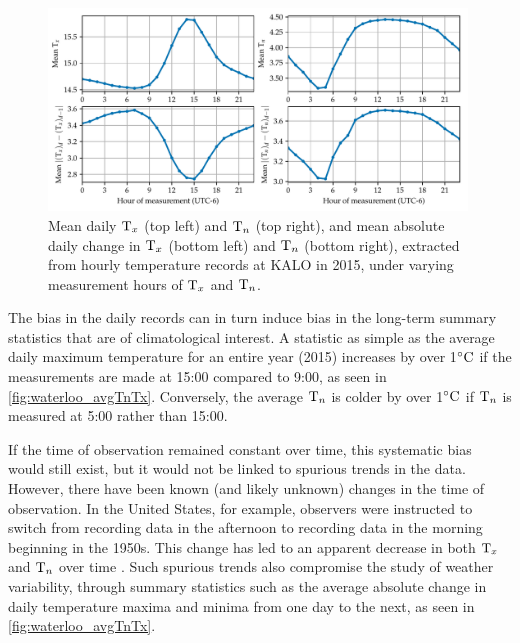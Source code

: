 \documentclass[12pt]{article}
\begin{document}
\begin{figure}[tbp]
\centering
\includegraphics[height=0.3\textheight,width=0.99\textwidth,keepaspectratio]{../figures/waterloo_bias_2x2.pdf}
\caption{
\label{fig:waterloo_avgTnTx}
Mean daily \(\mathrm{T}_{x}\) (top left) and \(\mathrm{T}_{n}\) (top right), and
mean absolute daily change in \(\mathrm{T}_{x}\) (bottom left) and \(\mathrm{T}_{n}\) (bottom right),
extracted from hourly temperature records at KALO in 2015,
under varying measurement hours of \(\mathrm{T}_{x}\) and \(\mathrm{T}_{n}\).}
\end{figure}

The bias in the daily records can in turn induce bias in the long-term summary statistics that are of climatological interest.
A statistic as simple as the average daily maximum temperature for an entire year (2015) increases by over 1\({}^{\circ}\mathrm{C}\) if the measurements are made at 15:00 compared to 9:00, as seen in \autoref{fig:waterloo_avgTnTx}.
Conversely, the average \(\mathrm{T}_{n}\) is colder by over 1\({}^{\circ}\mathrm{C}\) if \(\mathrm{T}_{n}\) is measured at 5:00 rather than 15:00.

If the time of observation remained constant over time, this systematic bias would still exist, but it would not be linked to spurious trends in the data. However, there have been known (and likely unknown) changes in the time of observation.
In the United States, for example, observers were instructed to switch from recording data in the afternoon to recording data in the morning beginning in the 1950s.
This change has led to an apparent decrease in both \(\mathrm{T}_{x}\) and \(\mathrm{T}_{n}\) over time \citep{menne2009us}. 
Such spurious trends also compromise the study of weather variability, through summary statistics such as the average absolute change in daily temperature maxima and minima from one day to the next, as seen in \autoref{fig:waterloo_avgTnTx}.

\end{document}
